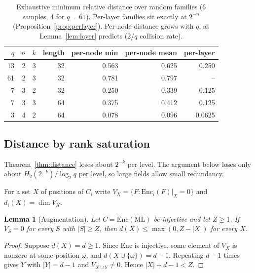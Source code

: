 \documentclass[11pt]{article}
\newtheorem{lemma}[theorem]{Lemma}
\theoremstyle{definition}
\newcommand{\ML}{\mathrm{ML}}
\newcommand{\Enc}{\mathrm{Enc}}
\begin{document}
\begin{table}[h]
\centering
\begin{tabular}{rrrrrrr}
\toprule
$q$ & $n$ & $k$ & length & per-node min & per-node mean & per-layer\\
\midrule
13 & 2 & 3 & 32 & 0.563 & 0.625 & 0.250\\
61 & 2 & 3 & 32 & 0.781 & 0.797 & --\\
7 & 3 & 2 & 32 & 0.250 & 0.339 & 0.125\\
7 & 3 & 3 & 64 & 0.375 & 0.412 & 0.125\\
3 & 4 & 2 & 64 & 0.078 & 0.096 & 0.0625\\
\bottomrule
\end{tabular}
\caption{Exhaustive minimum relative distance over random families (6 samples, 4 for $q=61$).
Per-layer families sit exactly at $2^{-n}$ (Proposition~\ref{prop:perlayer}). Per-node
distance grows with $q$, as Lemma~\ref{lem:layer} predicts ($2/q$ collision rate).}
\label{tab:exp}
\end{table}

\subsection{Distance by rank saturation}

Theorem~\ref{thm:distance} loses about $2^{-k}$ per level. The argument below loses only about
$H_2(2^{-k})/\log_2q$ per level, so large fields allow small redundancy.

For a set $X$ of positions of $C_i$ write $V_X=\{F:\Enc_i(F)|_X=0\}$ and $d_i(X)=\dim V_X$.

\begin{lemma}[Augmentation]\label{lem:augment}
Let $C=\Enc(\ML)$ be injective and let $Z\ge1$. If $V_S=0$ for every $S$ with $|S|\ge Z$, then
$d(X)\le\max(0,Z-|X|)$ for every $X$.
\end{lemma}
\begin{proof}
Suppose $d(X)=d\ge1$. Since $\Enc$ is injective, some element of $V_X$ is nonzero at some
position $\omega$, and $d(X\cup\{\omega\})=d-1$. Repeating $d-1$ times gives $Y$ with $|Y|=d-1$
and $V_{X\cup Y}\neq0$. Hence $|X|+d-1<Z$.
\end{proof}
\end{document}
